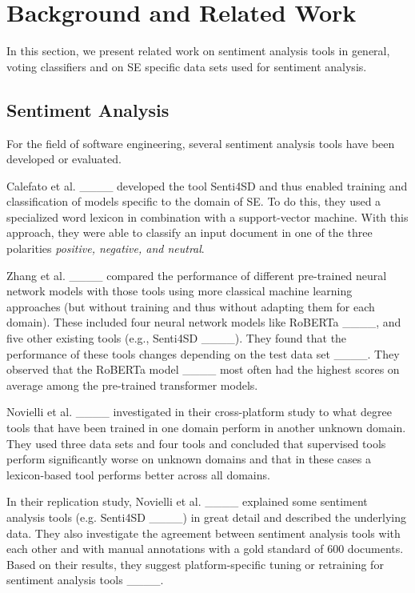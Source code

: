 \section{Background and Related Work}
\label{sec:background}

In this section, we present related work on sentiment analysis tools in general, voting classifiers and on SE specific data sets used for sentiment analysis.

\subsection{Sentiment Analysis}

For the field of software engineering, several sentiment analysis tools have been developed or evaluated.


Calefato et al. ____ developed the tool Senti4SD and thus enabled training and classification of models specific to the domain of SE. To do this, they used a specialized word lexicon in combination with a support-vector machine. With this approach, they were able to classify an input document in one of the three polarities \textit{positive, negative, and neutral}.

Zhang et al. ____ compared the performance of different pre-trained neural network models with those tools using more classical machine learning approaches (but without training and thus without adapting them for each domain). These included four neural network models like RoBERTa ____, and five other existing tools (e.g., Senti4SD ____). They found that the performance of these tools changes depending on the test data set ____. They observed that the RoBERTa model ____ most often had the highest scores on average among the pre-trained transformer models.

Novielli et al. ____ investigated in their cross-platform study to what degree tools that have been trained in one domain perform in another unknown domain. They used three data sets and four tools and concluded that supervised tools perform significantly worse on unknown domains and that in these cases a lexicon-based tool performs better across all domains.

In their replication study, Novielli et al. ____ explained some sentiment analysis tools (e.g. Senti4SD ____) in great detail and described the underlying data. They also investigate the agreement between sentiment analysis tools with each other and with manual annotations with a gold standard of 600 documents. Based on their results, they suggest platform-specific tuning or retraining for sentiment analysis tools ____.


